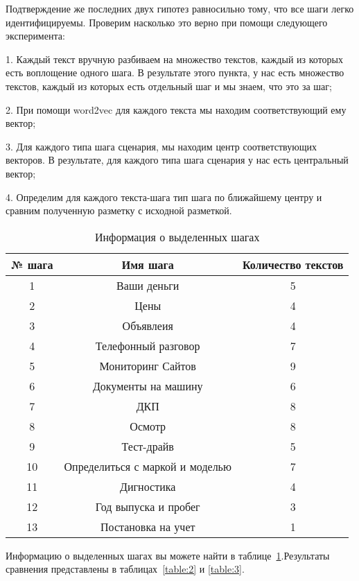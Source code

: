 \documentclass[12pt]{article}
\begin{document}
Подтверждение же последних двух гипотез равносильно тому, что все шаги легко идентифицируемы. Проверим насколько это верно при помощи следующего эксперимента:

1. Каждый текст вручную разбиваем на множество текстов, каждый из которых есть воплощение одного шага. В результате этого пункта, у нас есть множество текстов, каждый из которых есть отдельный шаг и мы знаем, что это за шаг;

2. При помощи word2vec для каждого текста мы находим соответствующий ему вектор;

3.  Для каждого типа шага сценария, мы находим центр соответствующих векторов. В результате, для каждого типа шага сценария у нас есть центральный вектор;

4. Определим для каждого текста-шага тип шага по ближайшему центру и сравним полученную разметку с исходной разметкой.

\begin{table}[h!]
\centering
\begin{tabular}{||c|c|c||} 
 \hline
 № шага & Имя шага &Количество текстов\\
 \hline
 1&  Ваши деньги&5\\ 
 2&  Цены&4  \\ 
 3&  Объявлеия&4  \\ 
 4&  Телефонный разговор&7  \\ 
 5&  Мониторинг Сайтов&9\\ 
 6&  Документы на машину&6  \\ 
 7&  ДКП&8  \\ 
 8&  Осмотр&8  \\ 
 9&  Тест-драйв&5  \\ 
 10&  Определиться с маркой и моделью&7  \\ 
 11&  Дигностика&4  \\ 
 12&  Год выпуска и пробег&3  \\ 
 13&  Постановка на учет&1  \\ 
 \hline
\end{tabular}
\caption{Информация о выделенных шагах}
\label{table:2.0}
\end{table}


Информацию о выделенных шагах вы можете найти в таблице~\ref{table:2.0}.Результаты сравнения представлены в таблицах~\ref{table:2} и \ref{table:3}.
\end{document}
